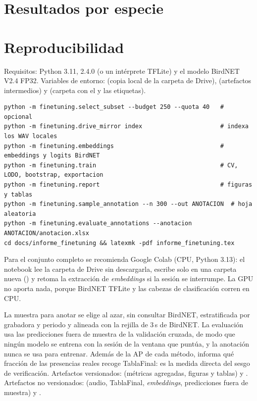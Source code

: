 \documentclass[11pt,a4paper]{article}
\newcommand{\tabdir}{../../finetuning/results/tables}
\begin{document}



\appendix
\section{Resultados por especie}\label{app:species}


\section{Reproducibilidad}\label{app:repro}
Requisitos: Python 3.11,  2.4.0 (o un intérprete TFLite) y el modelo BirdNET V2.4 FP32. Variables de entorno:
 (copia local de la carpeta de Drive),  (artefactos intermedios) y 
(carpeta con el  y las etiquetas).
\begin{lstlisting}
python -m finetuning.select_subset --budget 250 --quota 40   # opcional
python -m finetuning.drive_mirror index                      # indexa los WAV locales
python -m finetuning.embeddings                              # embeddings y logits BirdNET
python -m finetuning.train                                   # CV, LODO, bootstrap, exportacion
python -m finetuning.report                                  # figuras y tablas
python -m finetuning.sample_annotation --n 300 --out ANOTACION  # hoja aleatoria
python -m finetuning.evaluate_annotations --anotacion ANOTACION/anotacion.xlsx
cd docs/informe_finetuning && latexmk -pdf informe_finetuning.tex
\end{lstlisting}
Para el conjunto completo se recomienda Google Colab (CPU, Python 3.13): el notebook  lee la carpeta de
Drive sin descargarla, escribe solo en una carpeta nueva () y retoma la extracción de \emph{embeddings} si la sesión se
interrumpe. La GPU no aporta nada, porque BirdNET TFLite y las cabezas de clasificación corren en CPU.

La muestra para anotar se elige al azar, sin consultar BirdNET, estratificada por grabadora y periodo y alineada con la rejilla de 3\,s de BirdNET.
La evaluación usa las predicciones fuera de muestra de la validación cruzada, de modo que ningún modelo se entrena con la sesión de la ventana que
puntúa, y la anotación nunca se usa para entrenar. Además de la AP de cada método, informa qué fracción de las presencias reales recoge
TablaFinal: es la medida directa del sesgo de verificación.
Artefactos versionados:  (métricas agregadas, figuras y tablas) y .
Artefactos no versionados:  (audio, TablaFinal, \emph{embeddings}, predicciones fuera de muestra) y
.
\end{document}
